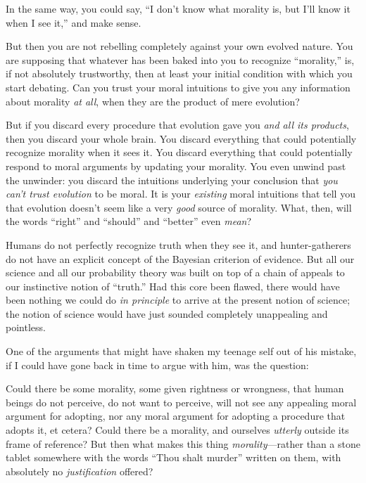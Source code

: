  In the same way, you could say, ``I
don't know what morality is, but I'll
know it when I see it,'' and make sense.


 But then you are not rebelling completely against your own evolved
nature. You are supposing that whatever has been baked into you to
recognize ``morality,'' is, if not
absolutely trustworthy, then at least your initial condition with which
you start debating. Can you trust your moral intuitions to give you any
information about morality \textit{at all}, when they are the product
of mere evolution?


 But if you discard every procedure that evolution gave you
\textit{and all its products}, then you discard your whole brain. You
discard everything that could potentially recognize morality when it
sees it. You discard everything that could potentially respond to moral
arguments by updating your morality. You even unwind past the unwinder:
you discard the intuitions underlying your conclusion that \textit{you
can't trust evolution} to be moral. It is your
\textit{existing} moral intuitions that tell you that evolution
doesn't seem like a very \textit{good} source of
morality. What, then, will the words
``right'' and
``should'' and
``better'' even \textit{mean}?


 Humans do not perfectly recognize truth when they see it, and
hunter-gatherers do not have an explicit concept of the Bayesian
criterion of evidence. But all our science and all our probability
theory was built on top of a chain of appeals to our instinctive notion
of ``truth.'' Had this core been
flawed, there would have been nothing we could do \textit{in principle}
to arrive at the present notion of science; the notion of science would
have just sounded completely unappealing and pointless.


 One of the arguments that might have shaken my teenage self out of
his mistake, if I could have gone back in time to argue with him, was
the question:


 Could there be some morality, some given rightness or wrongness,
that human beings do not perceive, do not want to perceive, will not
see any appealing moral argument for adopting, nor any moral argument
for adopting a procedure that adopts it, et cetera? Could there be a
morality, and ourselves \textit{utterly} outside its frame of
reference? But then what makes this thing \textit{morality}{}---rather
than a stone tablet somewhere with the words ``Thou
shalt murder'' written on them, with absolutely no
\textit{justification} offered?


